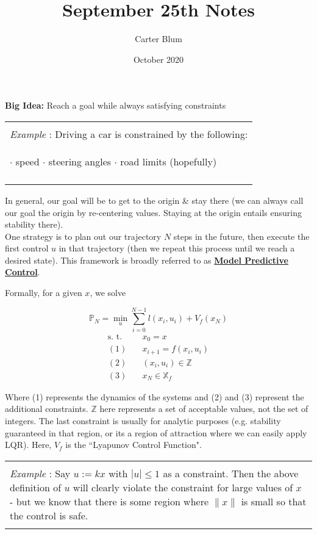 \documentclass{article}
\title{September 25th Notes}
\author{Carter Blum}
\date{October 2020}
\newenvironment{parboxed}
    {\begin{center}
    \begin{tabular}{|p{0.9\textwidth}|}
    \hline\\
    }
    { 
    \\\\\hline
    \end{tabular} 
    \end{center}
    }
\begin{document}
\maketitle

\textbf{Big Idea: } Reach a goal while always satisfying constraints

\begin{parboxed}
\emph{Example} : Driving a car is constrained by the following:\\
\begin{center}
    $\cdot$ speed $\cdot$ steering angles $\cdot$ road limits (hopefully)
\end{center}
\end{parboxed}

In general, our goal will be to get to the origin \& stay there (we can always call our goal the origin by re-centering values. Staying at the origin entails ensuring stability there).\\

One strategy is to plan out our trajectory $N$ steps in the future, then execute the first control $u$ in that trajectory (then we repeat this process until we reach a desired state). 
This framework is broadly referred to as \textbf{\underline{Model Predictive Control}}.

Formally, for a given $x$, we solve 

$$\mathbb{P}_N = \min_u \sum_{i=0}^{N-1} l(x_i, u_i) + V_f(x_N)$$
\begin{equation*}
\begin{split}
        \textrm{s. t. } & x_0 = x\\
    (1) \quad & x_{i+1} = f(x_i, u_i)\\
    (2) \quad & (x_i, u_i) \in \mathbb{Z}\\
    (3) \quad & x_N \in \mathbb{X}_f
\end{split}
\end{equation*}

Where (1) represents the dynamics of the systems and (2) and (3) represent the additional constraints. $\mathbb{Z}$ here represents a set of acceptable values, not the set of integers.
The last constraint is usually for analytic purposes (e.g. stability guaranteed in that region, or its a region of attraction where we can easily apply LQR).
Here, $V_f$ is the ``Lyapunov Control Function".

\begin{parboxed}
\emph{Example} : Say $u:=kx$ with $|u| \leq 1$ as a constraint.
Then the above definition of $u$ will clearly violate the constraint for large values of $x$ - but we know that there is some region where $\|x\|$ is small so that the control is safe.
\end{parboxed}
\end{document}
